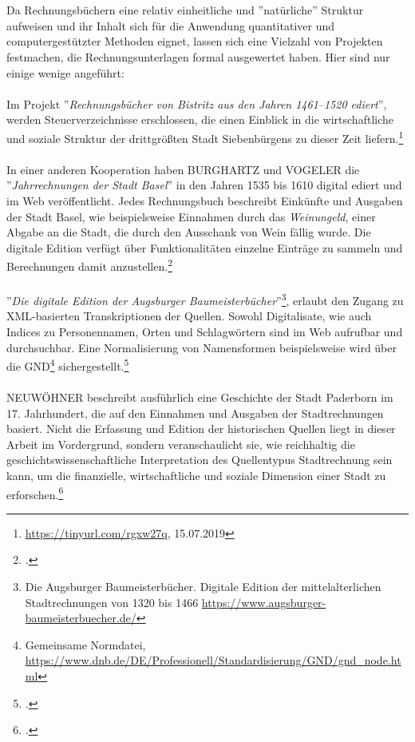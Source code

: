 \documentclass[12pt,a4paper]{article}
\begin{document}
\\
\\
Da Rechnungsbüchern eine relativ einheitliche und ''natürliche'' Struktur aufweisen und ihr Inhalt sich für die Anwendung quantitativer und computergestützter Methoden eignet, lassen sich eine Vielzahl von Projekten festmachen, die Rechnungsunterlagen formal ausgewertet haben. Hier sind nur einige wenige angeführt:
\\
\\
Im Projekt ''\textit{Rechnungsbücher von Bistritz aus den Jahren 1461–1520 ediert}'', werden Steuerverzeichnisse erschlossen, die einen Einblick in die wirtschaftliche und soziale Struktur der drittgrößten Stadt Siebenbürgens zu dieser Zeit liefern.\footnote{\url{https://tinyurl.com/rgxw27q}, 15.07.2019}
\\
\\
In einer anderen Kooperation haben BURGHARTZ und VOGELER die ''\textit{Jahrrechnungen der Stadt Basel}'' in den Jahren 1535 bis 1610 digital ediert und im Web veröffentlicht. Jedes Rechnungsbuch beschreibt Einkünfte und Ausgaben der Stadt Basel, wie beispielsweise Einnahmen durch das \textit{Weinungeld}, einer Abgabe an die Stadt, die durch den Ausschank von Wein fällig wurde. Die digitale Edition verfügt über Funktionalitäten einzelne Einträge zu sammeln und  Berechnungen damit anzustellen.\footcite[][S.11-13, \protect\url{https:gams.uni-graz.at/srbas}]{vogeler2016content}
\\
\\
''\textit{Die digitale Edition der Augsburger Baumeisterbücher}''\footnote{Die Augsburger Baumeisterbücher. Digitale Edition der mittelalterlichen Stadtrechnungen von 1320 bis 1466 \protect\url{https://www.augsburger-baumeisterbuecher.de/}}, erlaubt den Zugang zu XML-basierten Transkriptionen der Quellen. Sowohl Digitalisate, wie auch Indices zu Personennamen, Orten und Schlagwörtern sind im Web aufrufbar und durchsuchbar. Eine Normalisierung von Namensformen beispielsweise wird über die GND\footnote{Gemeinsame Normdatei, \protect\url{https://www.dnb.de/DE/Professionell/Standardisierung/GND/gnd_node.html}} sichergestellt.\footcite[][S.109-113]{wurz2016dh}
\\
\\
NEUWÖHNER beschreibt  ausführlich eine Geschichte der Stadt Paderborn im 17. Jahrhundert, die auf den Einnahmen und Ausgaben der Stadtrechnungen basiert. Nicht die Erfassung und Edition der historischen Quellen liegt in dieser Arbeit im Vordergrund, sondern veranschaulicht sie, wie reichhaltig die geschichtswissenschaftliche Interpretation des Quellentypus Stadtrechnung sein kann, um die finanzielle, wirtschaftliche und soziale Dimension einer Stadt zu erforschen.\footcite[][S.11-50]{neuwohner2016rechnen}  
\end{document}
